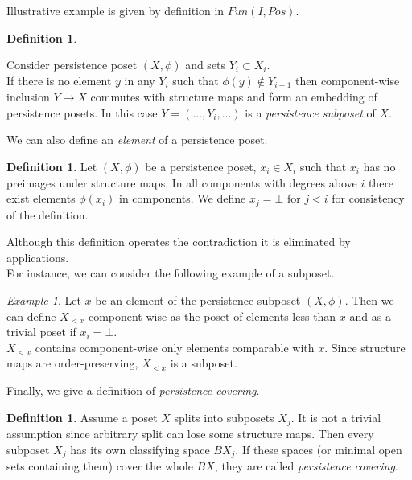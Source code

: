\documentclass[a4paper, 12pt]{article}
\newcounter{stmcounter}[section]
\numberwithin{equation}{section}
\theoremstyle{definition}
\newtheorem{definition}[stmcounter]{Definition}
\theoremstyle{remark}
\newtheorem{example}[stmcounter]{Example}
\newcommand{\define}[1]{{\textit{#1}}}
\begin{document}
Illustrative example is given by definition in $Fun(I, Pos)$.\\

\begin{definition} ~ \par
  Consider persistence poset $(X,\phi)$ and sets $Y_i \subset X_i$.\\

  If there is no element $y$ in any $Y_i$ such that $\phi(y) \not\in Y_{i+1}$ then component-wise inclusion $Y \to X$ commutes with structure maps and form an embedding of persistence posets. In this case $Y=(\ldots,Y_i,\ldots)$ is a \define {persistence subposet} of $X$.
\end{definition}

We can also define an \define{element} of a persistence poset.
\begin{definition}
  Let $(X,\phi)$ be a persistence poset, $x_i \in X_i$ such that $x_i$ has no preimages under structure maps. In all components with degrees above $i$ there exist elements $\phi(x_i)$ in components. We define $x_j = \bot$ for $j < i$ for consistency of the definition.
\end{definition}

Although this definition operates the contradiction it is eliminated by applications.\\
For instance, we can consider the following example of a subposet.
\begin{example}
  Let $x$ be an element of the persistence subposet $(X, \phi)$. Then we can define $X_{<x}$ component-wise as the poset of elements less than $x$ and as a trivial poset if $x_i = \bot$.\\

  $X_{<x}$ contains component-wise only elements comparable with $x$. Since structure maps are order-preserving, $X_{<x}$ is a subposet.
\end{example}

Finally, we give a definition of \define{persistence covering}.\\

\begin{definition}
  Assume a poset $X$ splits into subposets $X_j$. It is not a trivial assumption since arbitrary split can lose some structure maps. Then every subposet $X_j$ has its own classifying space $BX_j$. If these spaces (or minimal open sets containing them) cover the whole $BX$, they are called \define{persistence covering}.
\end{definition}
\end{document}
